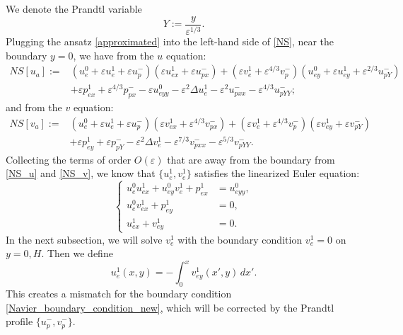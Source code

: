 \documentclass[reqno, 11pt]{amsart}
\theoremstyle{plain}
\theoremstyle{definition}
\theoremstyle{remark}
\numberwithin{equation}{section}
\begin{document}
We denote the Prandtl variable
$$
Y := \frac{y}{\varepsilon^{1/3}}.
$$
Plugging the ansatz \eqref{approximated} into the left-hand side of \eqref{NS}, near the boundary $y = 0$, we have from the $u$ equation:
\begin{equation}\label{NS_u}
\begin{aligned}
NS[u_a]:=& (u_e^0 + \varepsilon u_e^1 + \varepsilon u_p^-)(\varepsilon u_{ex}^1 + \varepsilon u_{px}^-) + (\varepsilon v_e^1 + \varepsilon^{4/3} v_p^-)(u_{ey}^0 + \varepsilon u_{ey}^1 + \varepsilon^{2/3} u_{pY}^-)\\
&+ \varepsilon p_{ex}^1 + \varepsilon^{4/3} p_{px}^- - \varepsilon u_{eyy}^0 - \varepsilon^2 \Delta u_e^1 - \varepsilon^2 u_{pxx}^- - \varepsilon^{4/3} u_{pYY}^-;
\end{aligned}
\end{equation}
and from the $v$ equation:
\begin{equation}\label{NS_v}
\begin{aligned}
NS[v_a]:=& (u_e^0 + \varepsilon u_e^1 + \varepsilon u_p^-) (\varepsilon v_{ex}^1 + \varepsilon^{4/3} v_{px}^-) + (\varepsilon v_e^1 + \varepsilon^{4/3} v_p^-) (\varepsilon v_{ey}^1 + \varepsilon v_{pY}^-)\\
&+ \varepsilon p_{ey}^1 + \varepsilon p_{pY}^- - \varepsilon^2 \Delta v_e^1 - \varepsilon^{7/3} v_{pxx}^- - \varepsilon^{5/3} v_{pYY}^-.
\end{aligned}
\end{equation}
Collecting the terms of order $O(\varepsilon)$ that are away from the boundary from \eqref{NS_u} and \eqref{NS_v}, we know that $\{ u_e^1, v_e^1 \}$ satisfies the linearized Euler equation:
\begin{equation}\label{first_Euler_layer}
\left\{\begin{aligned}
u_e^0 u_{ex}^1 + u_{ey}^0 v_e^1 + p_{ex}^1 &= u_{eyy}^0,\\
u_e^0 v_{ex}^1 + p_{ey}^1 &= 0,\\
u_{ex}^1 + v_{ey}^1 &= 0.
\end{aligned}\right.
\end{equation}
In the next subsection, we will solve $v_e^1$ with the boundary condition $v_e^1 = 0$ on $y = 0, H$. Then we define 
\begin{equation}\label{first_Euler_u}
u_e^1(x,y) = - \int_0^x v_{ey}^1(x',y) \, dx'.
\end{equation}
This creates a mismatch for the boundary condition \eqref{Navier_boundary_condition_new}, which will be corrected by the Prandtl profile $\{u_p^-, v_p^-\}$.
\end{document}
